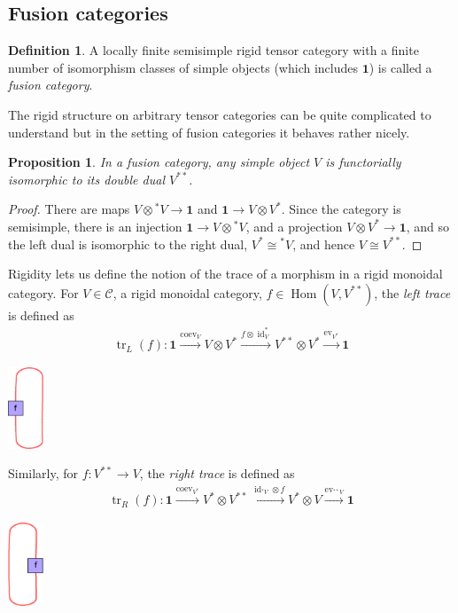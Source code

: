 \documentclass[11pt]{book}
\newtheorem{Prop}[theorem]{Proposition}
\theoremstyle{Rem}
\theoremstyle{definition}
\newtheorem{Def}[theorem]{Definition}
\numberwithin{equation}{section}
\newcommand\tr{\operatorname{tr}}
\newcommand\id{\operatorname{id}}
\newcommand\Hom{\operatorname{Hom}}
\newcommand\C{\mathcal C}
\newcommand\one{\mathbf{1}}
\newcommand\ev{\operatorname{ev}}
\newcommand\coev{\operatorname{coev}}
\begin{document}
\subsection{Fusion categories}
\begin{Def}
A locally finite semisimple rigid tensor category with a finite number of isomorphism classes of simple objects (which includes $\one$) is called a \textit{fusion category}.
\end{Def}
The rigid structure on arbitrary tensor categories can be quite complicated to understand but in the setting of fusion categories it behaves rather nicely.
\begin{Prop}
In a fusion category, any simple object $V$  is functorially isomorphic to its double dual $V^{**}$.
\end{Prop}
\begin{proof}
There are maps $V\otimes {}^*V\rightarrow \one$ and $\one \rightarrow V\otimes V^* $. Since the category is semisimple, there is an injection  $ \one \rightarrow V\otimes {}^*V$, and a projection $V\otimes V^*\rightarrow \one$, and so the left dual is isomorphic to the right dual, $V^*\cong {}^*V$, and hence $V\cong V^{**}$.
\end{proof}

Rigidity lets us define the notion of the trace of a morphism in a rigid monoidal category. For $V\in \C$, a rigid monoidal category,  $f\in \Hom(V, V^{**})$, the \textit{left trace}  is defined as \begin{align}
\tr_L(f): \one \overset{\coev_V}\longrightarrow V\otimes V^{*} \overset{f\otimes \id_V^*}\longrightarrow V^{**} \otimes V^* \overset{\ev_{V^*}}\longrightarrow \one \end{align} 
\begin{center}
\includegraphics[width=0.08\textwidth]{lefttrace.eps}
\end{center}

Similarly, for $f: V^{**} \rightarrow V$, the \textit{right trace} is defined as
\begin{align}
\tr_R(f): \one \overset{\coev_{V^*}}\longrightarrow V^*\otimes V^{**} \overset{\id_{{}^*V}\otimes f}\longrightarrow V^* \otimes V \overset{\ev_{{}^{**}V}}\longrightarrow \one  
\end{align}
\begin{center}
\includegraphics[width=0.08\textwidth]{righttrace.eps}
\end{center}
\end{document}
